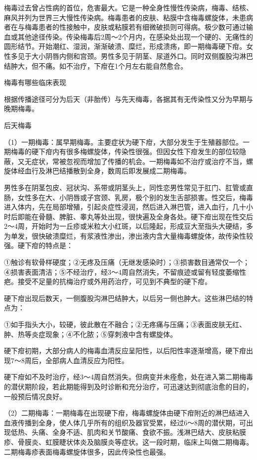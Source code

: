 \documentclass[12pt,UTF8,openany]{ctexbook}
\begin{document}
梅毒过去曾占性病的首位，危害最大。它是一种全身性慢性传染病，梅毒、结核、麻风并列为世界三大慢性传染病。梅毒患者的皮肤、粘膜中含梅毒螺旋体，未患病者在与梅毒患者的性接触中，皮肤或粘膜若有细微破损则可得病。极少数可通过输血或其他途径传染。传染梅毒后2周～2个月内，在感染处出现一个硬的、无痛性的圆形结节。开始潮红、湿润，渐渐破溃、糜烂，形成溃疡，即一期梅毒硬下疳。女性多见于大小阴唇内侧和宫颈。男性多见于阴茎、尿道外口。同时双侧腹股沟淋巴结肿大，但不痛。如不治疗，下疳在1个月左右能自然愈合。





梅毒有哪些临床表现


根据传播途径可分为后天（非胎传）与先天梅毒，各据其有无传染性又分为早期与晚期梅毒。

后天梅毒

（1）一期梅毒：属早期梅毒。主要症状为硬下疳，大部分发生于生殖器部位。一期梅毒的硬下疳内有很多梅螺旋体，传染性很强。但因女性下疳发生的部位较隐蔽，又无症状，常被忽视而增加了传播的机会。一期梅毒如不治疗或治疗不当，螺旋体经血行及淋巴结播散到全身，数周后即发展成二期梅毒。

男性多在阴茎包皮、冠状沟、系带或阴茎头上，同性恋男性常见于肛门、肛管或直肠，女性多在大、小阴唇或子宫颈、乳房，极个别的发生舌部损害。性交后，梅毒进入体内，先在局部增殖，引起炎症性浸润，然后进入淋巴管，进入血行，几十小时后即能在骨髓、脾脏、睾丸等处出现，很快遍及全身各处。硬下疳出现在性交后2～4周，开始时为一丘疹或米粒大小红斑，以后隆起，形成豆大至指头大硬结，多为单发，很快破溃糜烂，有浆液性渗出，渗出液内含大量梅毒螺旋体，故传染性较强。硬下疳的特点是：

①触诊有软骨样硬度；②无疼及压痛（无继发感染时）；③损害数目通常仅一个；④损害表面清洁；⑤不经治疗，经3～4周自然消失，不留痕迹或留有轻度萎缩性疤。接受不足量的抗梅治疗或外用药治疗，可见到不典型的硬下疳。

硬下疳出现后数天，一侧腹股沟淋巴结肿大，以后另一侧也肿大。这些淋巴结的特点为：

①如手指头大小，较硬，彼此散在不融合；②无疼痛与压痛；③表面皮肤无红、肿、热等炎症现象；④不化脓；⑤穿刺液中含有螺旋体。

硬下疳初期，大部分病人的梅毒血清反应呈阳性，以后阳性率逐渐增高，硬下疳出现7～8周后，全部病人血清反应为阳性。

硬下疳如不及时治疗，经3～4周自然消失。但病变并未痊愈，处在进入第二期梅毒的潜伏期阶段，若此期能得到及时诊断和充分治疗，可迅速达到彻底治愈的目的，一般预后情况良好。

（2）二期梅毒：一期梅毒在出现硬下疳，梅毒螺旋体由硬下疳附近的淋巴结进入血液传播到全身，使人体几乎所有的组织及器官受累，经过6～8周的潜伏期，可出现低热、头痛、全身不适、肌肉和关节酸痛、食欲不振。浅淋巴结大、皮肤粘膜疹、骨膜炎、虹膜睫状体炎及脑膜炎等症状。这一段时期，临床上叫做二期梅毒。二期梅毒疹表面梅毒螺旋体很多，因此传染性也最强。
\end{document}
